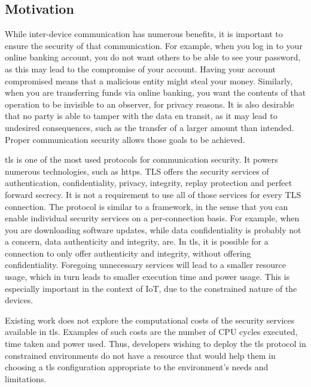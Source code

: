 \documentclass{llncs}
\begin{document}
\subsection{Motivation}
%

While inter-device communication has numerous benefits, it is important
to ensure the security of that communication. For example, when you log
in to your online banking account, you do not want others to be
able to see your password, as this may lead to the compromise of your
account. Having your account compromised means that a malicious entity
might steal your money. Similarly, when you are transferring funds via
online banking, you want the contents of that operation to be
invisible to an observer, for privacy reasons. It is also desirable
that no party is able to tamper with the data en transit,
as it may lead to undesired consequences, such as the transfer of a
larger amount than intended. Proper communication security allows
those goals to be achieved.

\gls{tls} is one of the most used protocols for communication security. It
powers numerous technologies, such as \gls{https}. TLS offers the
security services of authentication, confidentiality, privacy, integrity, replay
protection and perfect forward secrecy. It is not a requirement to use all of
those services for every TLS connection. The protocol is similar to
a framework, in the sense that you can enable individual security
services on a per-connection basis. For example, when you are downloading
software updates, while data confidentiality is probably not a concern,
data authenticity and integrity, are. In \gls{tls}, it is possible for a connection
to only offer authenticity and integrity, without offering confidentiality.
Foregoing unnecessary services will lead to a smaller resource usage,
which in turn leads to smaller execution time and power usage. This
is especially important in the context of IoT, due to the constrained
nature of the devices. 

Existing work does not explore the computational costs
of the security services available in \gls{tls}. Examples of such costs are the 
number of CPU cycles executed, time taken and power used.  
Thus, developers wishing to deploy the \gls{tls} protocol
in constrained environments do not have a resource that would help them in choosing a \gls{tls}
configuration appropriate to the environment's needs and limitations.
\end{document}
